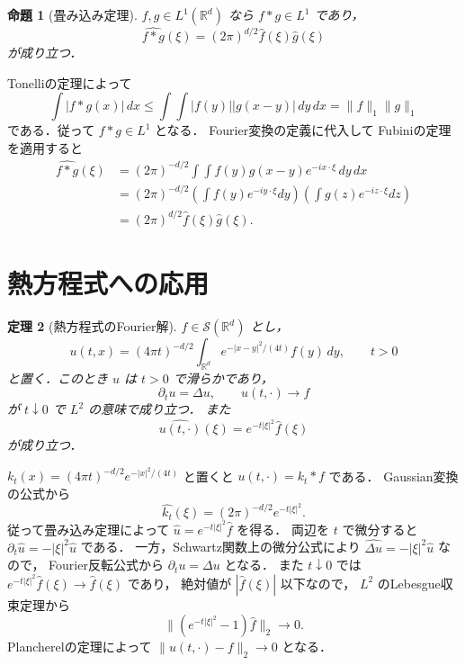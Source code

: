 \documentclass[a5paper,10pt,onecolumn]{jsarticle}
\makeatletter
\theoremstyle{mathnotetheorem}
\newtheorem{theorem}{定理}[section]
\newtheorem{proposition}[theorem]{命題}
\renewcommand{\proofname}{証明}
\renewenvironment{proof}[1][\proofname]{%
  \par\pushQED{\qed}\normalfont\topsep4\p@\@plus2\p@\relax
  \trivlist\item[\hskip\labelsep\bfseries #1]\ignorespaces
}{\popQED\endtrivlist\@endpefalse}
\newcommand{\norm}[1]{\lVert #1\rVert}
\makeatother
\begin{document}
\begin{proposition}[畳み込み定理]\label{prop:convolution}
$f,g\in L^1(\mathbb R^d)$ なら
$f*g\in L^1$ であり，
\[
 \widehat{f*g}(\xi)
 =(2\pi)^{d/2}\widehat f(\xi)\widehat g(\xi)
\]
が成り立つ．
\end{proposition}
\begin{proof}
Tonelliの定理によって
\[
 \int|f*g(x)|\,dx
 \le\int\int|f(y)||g(x-y)|\,dy\,dx
 =\norm f_1\norm g_1
\]
である．従って $f*g\in L^1$ となる．
Fourier変換の定義に代入して
Fubiniの定理を適用すると
\begin{align*}
 \widehat{f*g}(\xi)
 &=(2\pi)^{-d/2}\int\int
 f(y)g(x-y)e^{-ix\cdot\xi}\,dy\,dx\\
 &=(2\pi)^{-d/2}
 \left(\int f(y)e^{-iy\cdot\xi}dy\right)
 \left(\int g(z)e^{-iz\cdot\xi}dz\right)\\
 &=(2\pi)^{d/2}\widehat f(\xi)\widehat g(\xi).
\end{align*}
\end{proof}

\section{熱方程式への応用}

\begin{theorem}[熱方程式のFourier解]\label{thm:heat}
$f\in\mathcal S(\mathbb R^d)$ とし，
\[
 u(t,x)=(4\pi t)^{-d/2}
 \int_{\mathbb R^d}
 e^{-|x-y|^2/(4t)}f(y)\,dy,\qquad t>0
\]
と置く．このとき $u$ は $t>0$ で滑らかであり，
\[
 \partial_tu=\Delta u,\qquad
 u(t,\cdot)\to f
\]
が $t\downarrow0$ で $L^2$ の意味で成り立つ．
また
\[
 \widehat{u(t,\cdot)}(\xi)
 =e^{-t|\xi|^2}\widehat f(\xi)
\]
が成り立つ．
\end{theorem}
\begin{proof}
$k_t(x)=(4\pi t)^{-d/2}e^{-|x|^2/(4t)}$ と置くと
$u(t,\cdot)=k_t*f$ である．
Gaussian変換の公式から
\[
 \widehat{k_t}(\xi)
 =(2\pi)^{-d/2}e^{-t|\xi|^2}.
\]
従って畳み込み定理によって
$\widehat u=e^{-t|\xi|^2}\widehat f$ を得る．
両辺を $t$ で微分すると
$\partial_t\widehat u=-|\xi|^2\widehat u$ である．
一方，Schwartz関数上の微分公式により
$\widehat{\Delta u}=-|\xi|^2\widehat u$ なので，
Fourier反転公式から $\partial_tu=\Delta u$ となる．
また $t\downarrow0$ では
$e^{-t|\xi|^2}\widehat f(\xi)\to\widehat f(\xi)$ であり，
絶対値が $|\widehat f(\xi)|$ 以下なので，
$L^2$ のLebesgue収束定理から
\[
 \norm{(e^{-t|\xi|^2}-1)\widehat f}_2\to0.
\]
Plancherelの定理によって
$\norm{u(t,\cdot)-f}_2\to0$ となる．
\end{proof}
\end{document}
